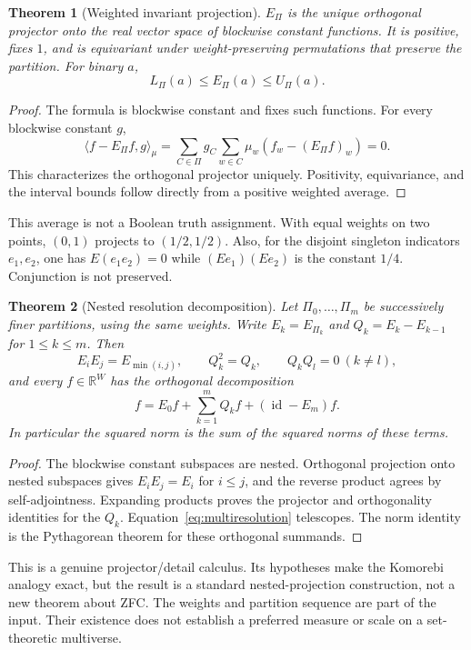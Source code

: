 \documentclass[11pt,letterpaper]{article}
\newtheorem{theorem}{Theorem}[section]
\theoremstyle{definition}
\newcommand{\id}{\operatorname{id}}
\begin{document}
\begin{theorem}[Weighted invariant projection]\label{thm:weighted}
$E_\Pi$ is the unique orthogonal projector onto the real vector space of blockwise constant functions. It is positive, fixes $1$, and is equivariant under weight-preserving permutations that preserve the partition. For binary $a$,
\[
L_\Pi(a)\leq E_\Pi(a)\leq U_\Pi(a).
\]
\end{theorem}
\begin{proof}
The formula is blockwise constant and fixes such functions. For every blockwise constant $g$,
\[
\langle f-E_\Pi f,g\rangle_\mu
=\sum_{C\in\Pi}g_C\sum_{w\in C}\mu_w(f_w-(E_\Pi f)_w)=0.
\]
This characterizes the orthogonal projector uniquely. Positivity, equivariance, and the interval bounds follow directly from a positive weighted average.
\end{proof}

This average is not a Boolean truth assignment. With equal weights on two points, $(0,1)$ projects to $(1/2,1/2)$. Also, for the disjoint singleton indicators $e_1,e_2$, one has $E(e_1e_2)=0$ while $(Ee_1)(Ee_2)$ is the constant $1/4$. Conjunction is not preserved.

\begin{theorem}[Nested resolution decomposition]\label{thm:multiresolution}
Let $\Pi_0,\ldots,\Pi_m$ be successively finer partitions, using the same weights. Write $E_k=E_{\Pi_k}$ and $Q_k=E_k-E_{k-1}$ for $1\leq k\leq m$. Then
\[
E_iE_j=E_{\min(i,j)},\qquad Q_k^2=Q_k,\qquad Q_kQ_l=0\ (k\ne l),
\]
and every $f\in\mathbb R^W$ has the orthogonal decomposition
\begin{equation}\label{eq:multiresolution}
f=E_0f+\sum_{k=1}^mQ_kf+(\id-E_m)f.
\end{equation}
In particular the squared norm is the sum of the squared norms of these terms.
\end{theorem}
\begin{proof}
The blockwise constant subspaces are nested. Orthogonal projection onto nested subspaces gives $E_iE_j=E_i$ for $i\leq j$, and the reverse product agrees by self-adjointness. Expanding products proves the projector and orthogonality identities for the $Q_k$. Equation~\eqref{eq:multiresolution} telescopes. The norm identity is the Pythagorean theorem for these orthogonal summands.
\end{proof}

This is a genuine projector/detail calculus. Its hypotheses make the Komorebi analogy exact, but the result is a standard nested-projection construction, not a new theorem about ZFC. The weights and partition sequence are part of the input. Their existence does not establish a preferred measure or scale on a set-theoretic multiverse.
\end{document}
